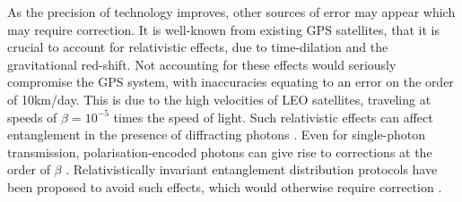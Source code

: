 As the precision of technology improves, other sources of error may appear which may require correction. It is well-known from existing GPS satellites, that it is crucial to account for relativistic effects, due to time-dilation and the gravitational red-shift. Not accounting for these effects would seriously compromise the GPS system, with inaccuracies equating to an error on the order of 10km/day. This is due to the high velocities of LEO satellites, traveling at speeds of $\beta = 10^{-5}$ times the speed of light. Such relativistic effects can affect entanglement in the presence of diffracting photons \cite{bib:gingrich03}. Even for single-photon transmission, polarisation-encoded photons can give rise to corrections at the order of $\beta$ \cite{bib:byrnes2017lorentz} . Relativistically invariant entanglement distribution protocols have been proposed to avoid such effects, which would otherwise require correction \cite{bib:yurtsever02, bib:li2003relativistic, bib:byrnes2017lorentz}.